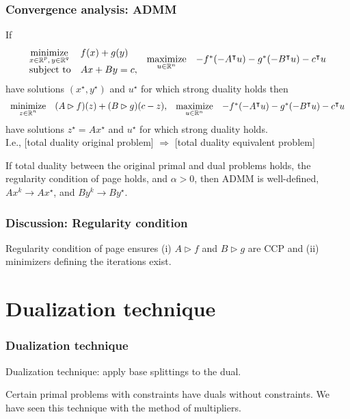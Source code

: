 \documentclass[10pt,mathserif]{beamer}
\begin{document}
\begin{frame}[fragile]
\frametitle{Convergence analysis: ADMM}
If
\begingroup\makeatletter\def\f@size{6}\check@mathfonts
\[
\begin{array}{ll}
\underset{\substack{x\in \mathbb{R}^p,\,y\in \mathbb{R}^q}}{\mbox{minimize}}&f(x)+g(y)\\
\mbox{subject to}&Ax+By=c,
\end{array}
\begin{array}{ll}
\underset{u  \in \mathbb{R}^n}{\mbox{maximize}}&-f^*(-A^\intercal u )-g^*(-B^\intercal u )-c^\intercal u 
\end{array}
\]
\endgroup
have solutions $(x^\star,y^\star)$ and $u ^\star$ for which strong duality holds
then
\begingroup\makeatletter\def\f@size{6}\check@mathfonts
\[
\begin{array}{ll}
\underset{\substack{z\in\mathbb{R}^n}}{\mbox{minimize}}&
(A\rhd f)(z)+(B\rhd g)(c-z),
\end{array}
\begin{array}{ll}
\underset{u  \in \mathbb{R}^n}{\mbox{maximize}}&-f^*(-A^\intercal u )-g^*(-B^\intercal u )-c^\intercal u
\end{array}
\]
\endgroup
have solutions $z^\star=Ax^\star$  and $u ^\star$ for which strong duality holds.\\
I.e., [total duality original problem] $\Rightarrow$ [total duality equivalent problem]




\vspace{0.2in}

If total duality between the original primal and dual problems holds,
the regularity condition of page \pageref{frame_admm_first} holds, and $\alpha>0$,
then ADMM is well-defined, $Ax^k\rightarrow Ax^\star$, and $By^k\rightarrow By^\star$.
\end{frame}



\begin{frame}
\frametitle{Discussion: Regularity condition}

Regularity condition of page \pageref{frame_admm_first} ensures
(i) $A\rhd f$ and $B\rhd g$ are CCP and
(ii) minimizers defining the iterations exist.

\end{frame}


\section{Dualization technique}
\begin{frame}
\frametitle{Dualization technique}

Dualization technique: apply base splittings to the dual.
\vspace{0.2in}

Certain primal problems with constraints have duals without constraints.
We have seen this technique with the method of multipliers.
\end{frame}
\end{document}
